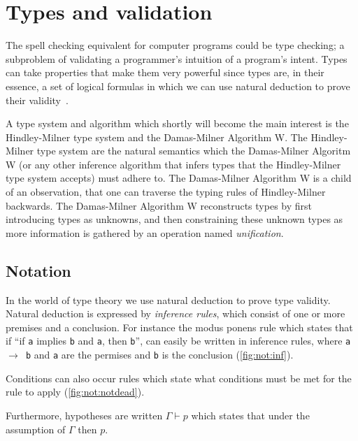 \documentclass[11pt,oneside,a4paper]{report}
\begin{document}
\section{Types and validation}
\label{sec:types}
The spell checking equivalent for computer programs could be type checking; a subproblem of validating a programmer's intuition of a program's intent.
Types can take properties that make them very powerful since types are, in their essence, a set of logical formulas in which we can use natural deduction to prove their validity~\cite{howard1980formulae}.

A type system and algorithm which shortly will become the main interest is the Hindley-Milner type system and the Damas-Milner Algorithm W.
The Hindley-Milner type system are the natural semantics which the Damas-Milner Algoritm W (or any other inference algorithm that infers types that the Hindley-Milner type system accepts) must adhere to.
The Damas-Milner Algorithm W is a child of an observation, that one can traverse the typing rules of Hindley-Milner backwards.
The Damas-Milner Algorithm W reconstructs types by first introducing types as unknowns, and then constraining these unknown types as more information is gathered by an operation named \textit{unification}.
\subsection{Notation}
In the world of type theory we use natural deduction to prove type validity.
Natural deduction is expressed by \textit{inference rules}, which consist of one or more premises and a conclusion.
For instance the modus ponens rule which states that if ``if \texttt{a} implies \texttt{b} and \texttt{a}, then \texttt{b}'', can easily be written in inference rules, where \texttt{a $\rightarrow$ b} and \texttt{a} are the permises and \texttt{b} is the conclusion (\autoref{fig:not:inf}).
\begin{figure}
  \begin{mdframed}
  \begin{prooftree}
  \end{prooftree}
  \end{mdframed}
  \caption{}
  \label{fig:not:inf}
\end{figure}
Conditions can also occur rules which state what conditions must be met for the rule to apply (\autoref{fig:not:notdead}).
\begin{figure}
  \begin{mdframed}
  \begin{prooftree}
  \end{prooftree}
  \end{mdframed}
  \caption{}
  \label{fig:not:notdead}
\end{figure}
Furthermore, hypotheses are written $\Gamma \vdash p$ which states that under the assumption of $\Gamma$ then $p$.
\end{document}
